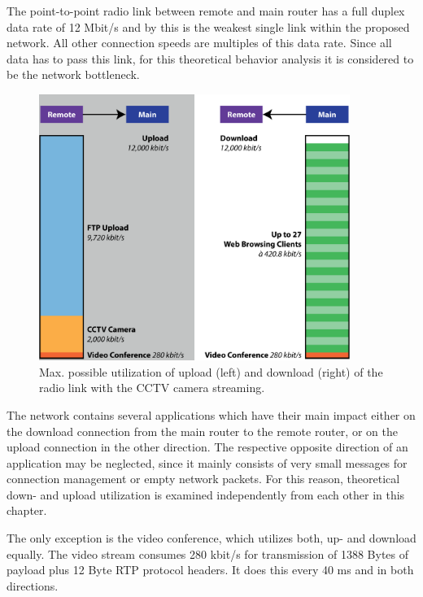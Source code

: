 \documentclass[a4paper,10pt]{book}\usepackage{graphicx}
\begin{document}
The point-to-point radio link between remote and main router has a full duplex data rate of 12 Mbit/s and by this is the weakest single link within the proposed network. All other connection speeds are multiples of this data rate. Since all data has to pass this link, for this theoretical behavior analysis it is considered to be the network bottleneck.
\begin{figure}[!ht]
  \begin{center}
    \includegraphics[width=0.9\textwidth]{graphics-01.eps}
    \caption{Max. possible utilization of upload (left) and download (right) of the radio link with the CCTV camera streaming.}
    \label{fig:radioLinkTheoryOn}
    \end{center}
\end{figure}

The network contains several applications which have their main impact either on the download connection from the main router to the remote router, or on the upload connection in the other direction. The respective opposite direction of an application may be neglected, since it mainly consists of very small messages for connection management or empty network packets. For this reason, theoretical down- and upload utilization is examined independently from each other in this chapter. 

The only exception is the video conference, which utilizes both, up- and download equally. The video stream consumes 280 kbit/s for transmission of 1388 Bytes of payload plus 12 Byte RTP protocol headers. It does this every 40 ms and in both directions.
\end{document}
